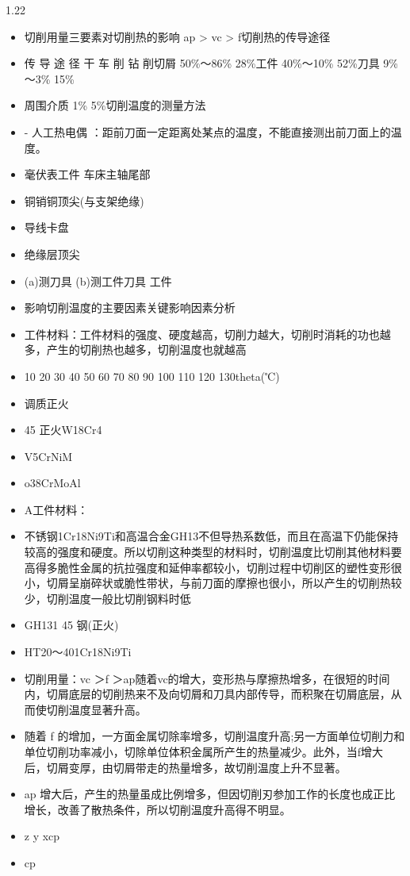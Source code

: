 \documentclass[12pt,a4paper]{article}
\begin{document}
\begin{spacing}{1.22}
\begin{itemize}[leftmargin=2.2em,label=--]
  \item 切削用量三要素对切削热的影响 ap > vc > f切削热的传导途径
  \item 传 导 途 径 干 车 削 钻 削切屑 50\%～86\% 28\%工件 40\%～10\% 52\%刀具 9\%～3\% 15\%
  \item 周围介质 1\% 5\%切削温度的测量方法
  \item - 人工热电偶 ：距前刀面一定距离处某点的温度，不能直接测出前刀面上的温度。
  \item 毫伏表工件 车床主轴尾部
  \item 铜销铜顶尖(与支架绝缘)
  \item 导线卡盘
  \item 绝缘层顶尖
  \item (a)测刀具 (b)测工件刀具 工件
  \item 影响切削温度的主要因素关键影响因素分析
  \item 工件材料：工件材料的强度、硬度越高，切削力越大，切削时消耗的功也越多，产生的切削热也越多，切削温度也就越高
  \item 10 20 30 40 50 60 70 80 90 100 110 120 130theta(℃)
  \item 调质正火
  \item 45 正火W18Cr4
  \item V5CrNiM
  \item o38CrMoAl
  \item A工件材料：
  \item 不锈钢1Cr18Ni9Ti和高温合金GH13不但导热系数低，而且在高温下仍能保持较高的强度和硬度。所以切削这种类型的材料时，切削温度比切削其他材料要高得多脆性金属的抗拉强度和延伸率都较小，切削过程中切削区的塑性变形很小，切屑呈崩碎状或脆性带状，与前刀面的摩擦也很小，所以产生的切削热较少，切削温度一般比切削钢料时低
  \item GH131 45 钢(正火)
  \item HT20～401Cr18Ni9Ti
  \item 切削用量：vc ＞f ＞ap随着vc的增大，变形热与摩擦热增多，在很短的时间内，切屑底层的切削热来不及向切屑和刀具内部传导，而积聚在切屑底层，从而使切削温度显著升高。
  \item 随着 f 的增加，一方面金属切除率增多，切削温度升高;另一方面单位切削力和单位切削功率减小，切除单位体积金属所产生的热量减少。此外，当f增大后，切屑变厚，由切屑带走的热量增多，故切削温度上升不显著。
  \item ap 增大后，产生的热量虽成比例增多，但因切削刃参加工作的长度也成正比增长，改善了散热条件，所以切削温度升高得不明显。
  \item z y xcp
  \item cp

\end{itemize}
\end{spacing}
\end{document}
